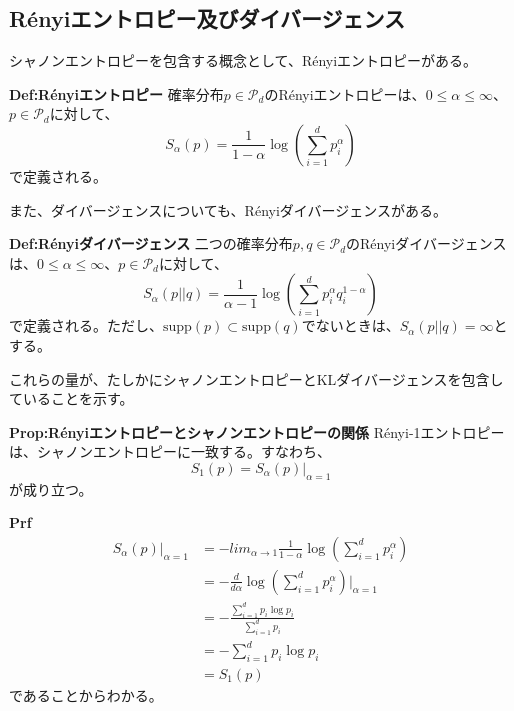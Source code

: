 \documentclass[a4paper,11pt]{jsarticle}
\numberwithin{equation}{section}
\begin{document}
\subsection{Rényiエントロピー及びダイバージェンス}
シャノンエントロピーを包含する概念として、Rényiエントロピーがある。\\
\begin{itembox}[l]{\textbf{Def:Rényiエントロピー}}
    確率分布$p \in \mathcal{P}_d$のRényiエントロピーは、$0 \leq \alpha \leq \infty$、$p \in \mathcal{P}_d$に対して、
    \begin{equation}
        S_{\alpha}(p) = \frac{1}{1-\alpha}\log(\sum_{i=1}^{d}p_i^{\alpha})
    \end{equation}
    で定義される。
\end{itembox}
また、ダイバージェンスについても、Rényiダイバージェンスがある。\\
\begin{itembox}[l]{\textbf{Def:Rényiダイバージェンス}}
    二つの確率分布$p, q \in \mathcal{P}_d$のRényiダイバージェンスは、$0 \leq \alpha \leq \infty$、$p \in \mathcal{P}_d$に対して、
    \begin{equation}
        S_{\alpha}(p||q) = \frac{1}{\alpha - 1}\log(\sum_{i=1}^{d}p_i^{\alpha}q_i^{1-\alpha})
    \end{equation}
    で定義される。ただし、$\text{supp}(p) \subset \text{supp}(q)$でないときは、$S_{\alpha}(p||q) = \infty$とする。
\end{itembox}
これらの量が、たしかにシャノンエントロピーとKLダイバージェンスを包含していることを示す。\\
\begin{itembox}[l]{\textbf{Prop:Rényiエントロピーとシャノンエントロピーの関係}}
    Rényi-1エントロピーは、シャノンエントロピーに一致する。すなわち、
    \begin{equation}
        S_1(p) = S_{\alpha}(p)|_{\alpha = 1}
    \end{equation}
    が成り立つ。
\end{itembox}
\textbf{Prf}\\
\begin{align}
    S_{\alpha}(p)|_{\alpha = 1} &= -lim_{\alpha \to 1}\frac{1}{1-\alpha}\log(\sum_{i=1}^{d}p_i^{\alpha})\\
    &= -\frac{d}{d\alpha}\log(\sum_{i=1}^{d}p_i^{\alpha})|_{\alpha = 1}\\
    &= -\frac{\sum_{i=1}^{d}p_i\log p_i}{\sum_{i=1}^{d}p_i}\\
    &= -\sum_{i=1}^{d}p_i\log p_i\\
    &= S_1(p)
\end{align}
であることからわかる。\hfill \qedsymbol\\
\end{document}
